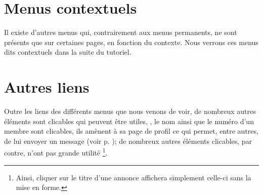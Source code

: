 \section{Menus contextuels}

Il existe d’autres menus qui, contrairement aux menus permanents, ne sont présents que sur certaines pages, \cad{} en fonction du contexte. Nous verrons ces menus dits contextuels dans la suite du tutoriel.

\section{Autres liens}\label{page:autresLiens}

Outre les liens des différents menus que nous venons de voir, de nombreux autres éléments sont clicables qui peuvent être utiles, \ex, le nom ainsi que le numéro d'un membre sont clicables, ils amènent à sa page de profil ce qui permet, entre autres, de lui envoyer un message (voir p. \pageref{page:envoyerCourrielMembre}); de nombreux autres éléments clicables, par contre, n’ont pas grande utilité%
\footnote{Ainsi, cliquer sur le titre d'une annonce affichera simplement celle-ci sans la mise en forme.}.
